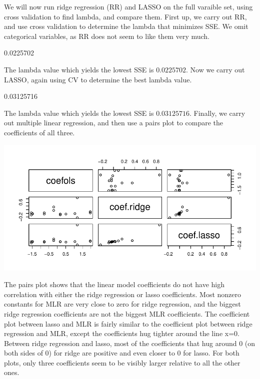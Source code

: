 \documentclass{article}
\begin{document}
We will now run ridge regression (RR) and LASSO on the full varaible set, using cross validation to find lambda, and compare them. First up, we carry out RR, and use cross validation to determine the lambda that minimizes SSE. We omit categorical variables, as RR does not seem to like them very much. 

\begin{Schunk}
\begin{Soutput}
[1] 0.0225702
\end{Soutput}
\end{Schunk}

The lambda value which yields the lowest SSE is $0.0225702$. Now we carry out LASSO, again using CV to determine the best lambda value. 

\begin{Schunk}
\begin{Soutput}
[1] 0.03125716
\end{Soutput}
\end{Schunk}

The lambda value which yields the lowest SSE is $0.03125716$. Finally, we carry out multiple linear regression, and then use a pairs plot to compare the coefficients of all three.




\includegraphics{Report_4-006}

The pairs plot shows that the linear model coefficients do not have high correlation with either the ridge regression or lasso coefficients. Most nonzero constants for MLR are very close to zero for ridge regression, and the biggest ridge regression coefficients are not the biggest MLR coefficients. The coefficient plot between lasso and MLR is fairly similar to the coefficient plot between ridge regression and MLR, except the coefficients hug tighter around the line x=0. Between ridge regression and lasso, most of the coefficients that hug around 0 (on both sides of 0) for ridge are positive and even closer to 0 for lasso. For both plots, only three coefficients seem to be visibly larger relative to all the other ones.
\end{document}
